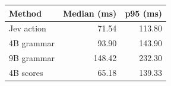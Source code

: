 \begin{tabular}{lrr}
\toprule
Method & Median (ms) & p95 (ms) \\
\midrule
Jev action & 71.54 & 113.80 \\
4B grammar & 93.90 & 143.90 \\
9B grammar & 148.42 & 232.30 \\
4B scores & 65.18 & 139.33 \\
\bottomrule
\end{tabular}
